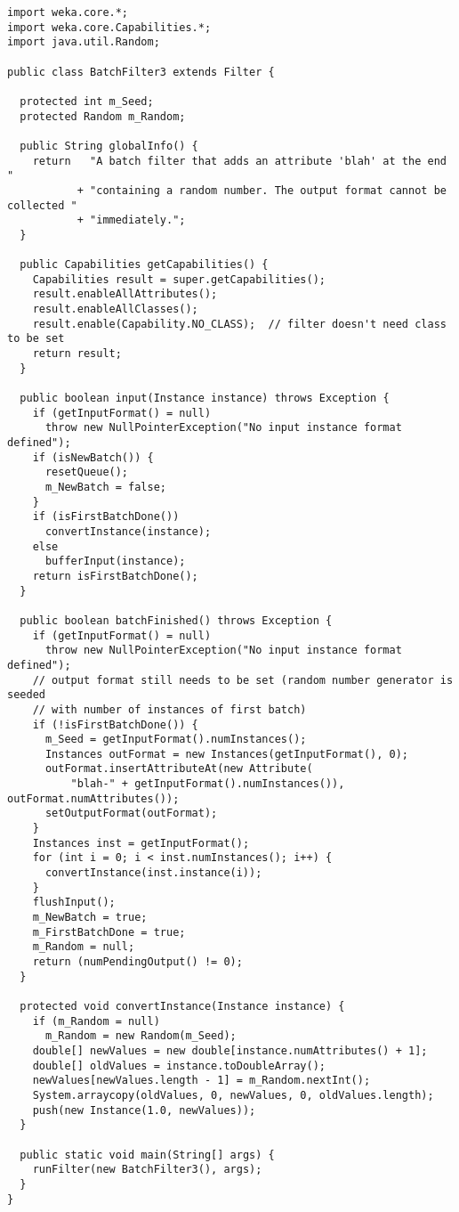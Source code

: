 
\begin{verbatim}
import weka.core.*;
import weka.core.Capabilities.*;
import java.util.Random;

public class BatchFilter3 extends Filter {

  protected int m_Seed;
  protected Random m_Random;

  public String globalInfo() {
    return   "A batch filter that adds an attribute 'blah' at the end "
           + "containing a random number. The output format cannot be collected "
           + "immediately.";
  }

  public Capabilities getCapabilities() {
    Capabilities result = super.getCapabilities();
    result.enableAllAttributes();
    result.enableAllClasses();
    result.enable(Capability.NO_CLASS);  // filter doesn't need class to be set
    return result;
  }

  public boolean input(Instance instance) throws Exception {
    if (getInputFormat() = null)
      throw new NullPointerException("No input instance format defined");
    if (isNewBatch()) {
      resetQueue();
      m_NewBatch = false;
    }
    if (isFirstBatchDone())
      convertInstance(instance);
    else
      bufferInput(instance);
    return isFirstBatchDone();
  }

  public boolean batchFinished() throws Exception {
    if (getInputFormat() = null)
      throw new NullPointerException("No input instance format defined");
    // output format still needs to be set (random number generator is seeded
    // with number of instances of first batch)
    if (!isFirstBatchDone()) {
      m_Seed = getInputFormat().numInstances();
      Instances outFormat = new Instances(getInputFormat(), 0);
      outFormat.insertAttributeAt(new Attribute(
          "blah-" + getInputFormat().numInstances()), outFormat.numAttributes());
      setOutputFormat(outFormat);
    }
    Instances inst = getInputFormat();
    for (int i = 0; i < inst.numInstances(); i++) {
      convertInstance(inst.instance(i));
    }
    flushInput();
    m_NewBatch = true;
    m_FirstBatchDone = true;
    m_Random = null;
    return (numPendingOutput() != 0);
  }

  protected void convertInstance(Instance instance) {
    if (m_Random = null)
      m_Random = new Random(m_Seed);
    double[] newValues = new double[instance.numAttributes() + 1];
    double[] oldValues = instance.toDoubleArray();
    newValues[newValues.length - 1] = m_Random.nextInt();
    System.arraycopy(oldValues, 0, newValues, 0, oldValues.length);
    push(new Instance(1.0, newValues));
  }

  public static void main(String[] args) {
    runFilter(new BatchFilter3(), args);
  }
}
\end{verbatim}
